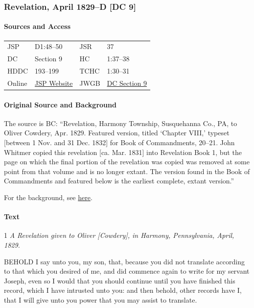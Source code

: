 		\subsubsection{Revelation, April 1829--D [DC 9]}
			\label{EMS-1828-1829-JS-APR-1829-D}
			
			\paragraph{Sources and Access}

				\begin{tabular}{p{1in}p{1.5in}p{1in}p{1.5in}}
				JSP	 	& D1:48--50		& JSR 		& 37		 \\  
				DC	 	& Section 9 	& HC 		& 1:37--38	 \\
				HDDC 	& 193--199 		& TCHC 		& 1:30--31	 \\
				Online  & \href{https://www.josephsmithpapers.org/paper-summary/revelation-april-1829-d-dc-9/1}{JSP Website} & 
				JWGB	& \hyperref[DC9]{DC Section 9} \\
				\end{tabular}
			
			\paragraph{Original Source and Background}
			
				The source is BC: ``Revelation, Harmony Township, Susquehanna Co., PA, to  Oliver Cowdery, Apr. 1829. Featured version, titled `Chapter VIII,' typeset [between 1 Nov. and 31 Dec. 1832] for Book of Commandments, 20--21. John Whitmer copied this revelation [ca. Mar. 1831] into Revelation Book 1, but the page on which the final portion of the revelation was copied was removed at some point from that volume and is no longer extant. The version found in the Book of Commandments and featured below is the earliest complete, extant version.''
				
				For the background, see \hyperref[DC9-HB]{here}.
			
			\paragraph{Text}
			
				1 \textit{A Revelation given to Oliver [Cowdery], in Harmony, Pennsylvania, April, 1829.}
				
				BEHOLD I say unto you, my son, that, because you did not translate according to that which you desired of me, and did commence again to write for my servant Joseph, even so I would that you should continue until you have finished this record, which I have intrusted unto you: and then behold, other records have I, that I will give unto you power that you may assist to translate.
				
